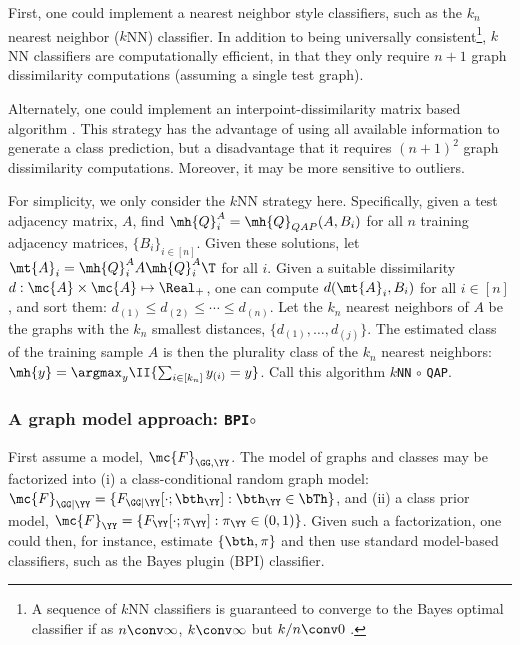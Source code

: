 \documentclass[10pt,journal,cspaper,compsoc]{IEEEtran}
\begin{document}

First, one could implement a nearest neighbor style classifiers, such as the $k_n$ nearest neighbor ($k$NN) classifier.  In addition to being universally consistent\footnote{A sequence of $k$NN classifiers is guaranteed to converge to the Bayes optimal classifier  if  as $n \conv \infty$, $k \conv \infty$ but $k/n \conv 0$ \cite{Devroye1997}.}, $k$NN classifiers are computationally efficient, in that they only require $n+1$ graph dissimilarity computations (assuming a single test graph).  

Alternately, one could implement an interpoint-dissimilarity matrix based algorithm \cite{Duin2011}. This strategy has the advantage of using all available information to generate a class prediction, but a disadvantage that it requires $(n+1)^2$ graph dissimilarity computations. Moreover, it may be more sensitive to outliers.

For simplicity, we only consider the $k$NN strategy here.  Specifically, given a test adjacency matrix, $A$, find $\mh{Q}_i^A=\mh{Q}_{QAP}(A,B_i)$ for all $n$ training adjacency matrices, $\{B_i\}_{i \in [n]}$.  Given these solutions, let $\mt{A}_i=\mh{Q}_i^A A {\mh{Q}_i^A}{}\T$ for all $i$. Given a suitable dissimilarity $d: \mc{A} \times \mc{A} \mapsto \Real_+$, one can compute $d(\mt{A}_i,B_i)$ for all $i \in [n]$, and sort them: $d_{(1)} \leq d_{(2)} \leq \cdots \leq d_{(n)}$.  Let the $k_n$ nearest neighbors of $A$ be the graphs with the $k_n$ smallest distances, $\{d_{(1)},\ldots, d_{(j)}\}$.  The estimated class of the training sample $A$ is then the plurality class of the $k_n$ nearest neighbors: $\mh{y}=\argmax_{y} \II\{\sum_{i \in [k_n]} y_{(i)} = y \}$. Call this algorithm \texttt{$k$NN} $\circ$ \texttt{QAP}.



\subsubsection{A graph model approach: \texttt{BPI}$\circ$\qap} %
\label{ssub:bayes_plugin_circ_qap}

First assume a model, $\mc{F}_{\GG,\YY}$.  The model of graphs and classes may be factorized into (i) a class-conditional random graph model: $\mc{F}_{\GG  | \YY} = \{F_{\GG|\YY}[\cdot; \bth_{\YY}] : \bth_{\YY} \in \bTh\}$, and (ii) a class prior model, $\mc{F}_{\YY} = \{F_{\YY}[\cdot; \pi_{\YY}] : \pi_{\YY} \in (0,1)\}$.  Given such a factorization, one could then, for instance, estimate $\{\bth,\pi\}$ and then use standard model-based classifiers, such as the Bayes plugin (BPI) classifier.  
\end{document}
